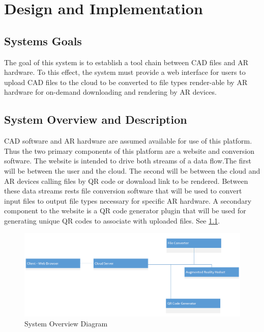 
\chapter{Design  and Implementation}

\section{Systems Goals}
The goal of this system is to establish a tool chain between CAD files and AR hardware. To this effect, the system must provide a web interface for users to upload CAD files to the cloud to be converted to file types render-able by AR hardware for on-demand downloading and rendering by AR devices.  

\section{System Overview and Description}
CAD software and AR hardware are assumed available for use of this platform. Thus the two primary components of this platform are a website and conversion software. The website is intended to drive both streams of a data flow.The first will be between the user and the cloud. The second will be between the cloud and AR devices calling files by QR code or download link to be rendered.  Between these data streams rests file conversion software that will be used to convert input files to output file types necessary for specific AR hardware. A secondary component to the website is a QR code generator plugin that will be used for generating unique QR codes to associate with uploaded files. See \ref{fig:UMLSystemOverview}.

\begin{figure}[H]
	\centering
	\includegraphics[width=\textwidth]{UMLSystemOverview.png}
	\caption{System Overview Diagram} 
	\label{fig:UMLSystemOverview}	
\end{figure}

